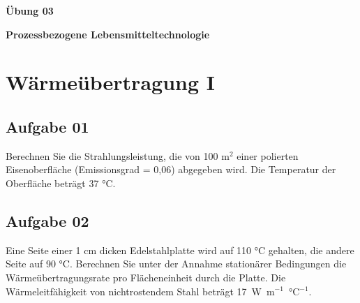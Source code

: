 \documentclass[a4paper,11pt]{article}
\newif\ifshowme
\begin{document}


\bckgrnd


\begin{center}
\LARGE
\color{white}
\textbf{Übung 03} \par \vspace*{2mm}
\large \color{miugray} \textbf{Prozessbezogene Lebensmitteltechnologie}
\end{center}
\par 
\vspace*{6mm}


\color{miudiutex}
\section*{Wärmeübertragung I}
\subsection*{Aufgabe 01}
Berechnen Sie die Strahlungsleistung, die von 100 m$^2$ einer polierten Eisenoberfläche
(Emissionsgrad = 0,06) abgegeben wird. Die Temperatur der Oberfläche beträgt 37 °C.


\ifshowme
\antwort{
\begin{align*}
P &= \varepsilon \cdot \sigma \cdot A \cdot T^4 \\ 
P &= 0,06 \cdot  100~\text{m}^2 \cdot 5,67 \cdot 10^{-8} ~\text{W} \cdot \text{m}^{-2}\text{K}^{-4}\cdot 310,15~\text{K}^4 \\
P &= 3.147,9~\text{W}
\end{align*}
}
\else
\fi

\subsection*{Aufgabe 02}
Eine Seite einer 1 cm dicken Edelstahlplatte wird auf 110 °C gehalten, die andere Seite
auf 90 °C. Berechnen Sie unter der Annahme stationärer Bedingungen die
Wärmeübertragungsrate pro Flächeneinheit durch die Platte. Die Wärmeleitfähigkeit von
nichtrostendem Stahl beträgt \mbox{17 W m$^{-1}$ °C$^{-1}$}.

\ifshowme
\antwort{
\begin{align*}
\dot{Q} &= - A \cdot \frac{\lambda}{d} \cdot (T_2 - T_1) \\
- \frac{\dot{Q}}{A} &= \cdot \frac{\lambda}{d} \cdot (T_2 - T_1) \\
- \frac{\dot{Q}}{A} &= \cdot \frac{17 \text{W} / \text{m°C}}{0,01m} \cdot 20\text{°C}\\
	&= 34.000 ~\text{W / m$^2$ s}
\end{align*}

}
\pagebreak
\else
\fi
\end{document}
